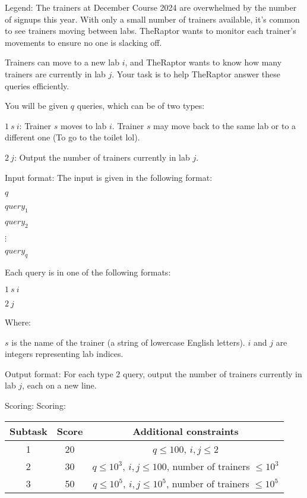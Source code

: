 Legend:
The trainers at December Course 2024 are overwhelmed by the number of signups this year. With only a small number of trainers available, it's common to see trainers moving between labs. TheRaptor wants to monitor each trainer's movements to ensure no one is slacking off.

Trainers can move to a new lab $i$, and TheRaptor wants to know how many trainers are currently in lab $j$. Your task is to help TheRaptor answer these queries efficiently.

You will be given $q$ queries, which can be of two types:

    $1\ s\ i$: Trainer $s$ moves to lab $i$. Trainer $s$ may move back to the same lab or to a different one (To go to the toilet lol).
    
    $2\ j$: Output the number of trainers currently in lab $j$.

Input format:
The input is given in the following format:

$q$

$query_1$

$query_2$

$\vdots$

$query_q$

Each query is in one of the following formats:

$1\ s\ i$

$2\ j$

Where:

    $s$ is the name of the trainer (a string of lowercase English letters).
    $i$ and $j$ are integers representing lab indices.

Output format:
For each type $2$ query, output the number of trainers currently in lab $j$, each on a new line.

Scoring:
Scoring:
\begin{table}[h!]
    \begin{center}
        \begin{tabular}{|c|c|c|} 
            \hline
            \textbf{Subtask} & \textbf{Score} & \textbf{Additional constraints} \\
            \hline
            1 & 20 & $q \leq 100$, $i, j \leq 2$ \\
            \hline
            2 & 30 & $q \leq 10^3$, $i, j \leq 100$, number of trainers $\leq 10^3$ \\
            \hline
            3 & 50 & $q \leq 10^5$, $i, j \leq 10^5$, number of trainers $\leq 10^5$ \\
            \hline
        \end{tabular}
    \end{center}
\end{table}

